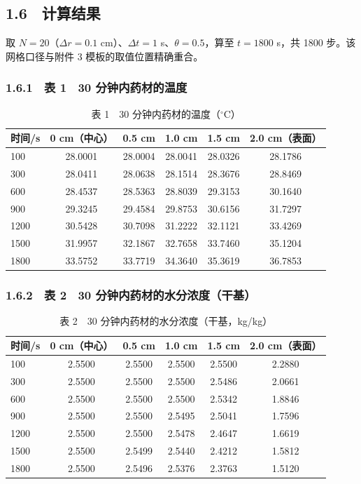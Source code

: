 \documentclass[12pt,a4paper]{ctexart}
\begin{document}
\subsection*{1.6　计算结果}

取 $N=20$（$\Delta r=0.1$ cm）、$\Delta t=1$ s、$\theta=0.5$，算至 $t=1800$ s，共 1800 步。该网格口径与附件 3 模板的取值位置精确重合。

\subsubsection*{1.6.1　表 1　30 分钟内药材的温度}

\begin{table}[H]
\centering
\caption{表 1　30 分钟内药材的温度（$^\circ$C）}
\begin{tabular}{lccccc}
\toprule
时间/s & 0 cm（中心） & 0.5 cm & 1.0 cm & 1.5 cm & 2.0 cm（表面） \\
\midrule
100 & 28.0001 & 28.0004 & 28.0041 & 28.0326 & 28.1786 \\
300 & 28.0411 & 28.0638 & 28.1514 & 28.3676 & 28.8469 \\
600 & 28.4537 & 28.5363 & 28.8039 & 29.3153 & 30.1640 \\
900 & 29.3245 & 29.4584 & 29.8753 & 30.6156 & 31.7297 \\
1200 & 30.5428 & 30.7098 & 31.2222 & 32.1121 & 33.4269 \\
1500 & 31.9957 & 32.1867 & 32.7658 & 33.7460 & 35.1204 \\
1800 & 33.5752 & 33.7719 & 34.3640 & 35.3619 & 36.7853 \\
\bottomrule
\end{tabular}
\end{table}

\subsubsection*{1.6.2　表 2　30 分钟内药材的水分浓度（干基）}

\begin{table}[H]
\centering
\caption{表 2　30 分钟内药材的水分浓度（干基，kg/kg）}
\begin{tabular}{lccccc}
\toprule
时间/s & 0 cm（中心） & 0.5 cm & 1.0 cm & 1.5 cm & 2.0 cm（表面） \\
\midrule
100 & 2.5500 & 2.5500 & 2.5500 & 2.5500 & 2.2880 \\
300 & 2.5500 & 2.5500 & 2.5500 & 2.5486 & 2.0661 \\
600 & 2.5500 & 2.5500 & 2.5500 & 2.5342 & 1.8846 \\
900 & 2.5500 & 2.5500 & 2.5495 & 2.5041 & 1.7596 \\
1200 & 2.5500 & 2.5500 & 2.5478 & 2.4647 & 1.6619 \\
1500 & 2.5500 & 2.5499 & 2.5440 & 2.4212 & 1.5812 \\
1800 & 2.5500 & 2.5496 & 2.5376 & 2.3763 & 1.5120 \\
\bottomrule
\end{tabular}
\end{table}
\end{document}
